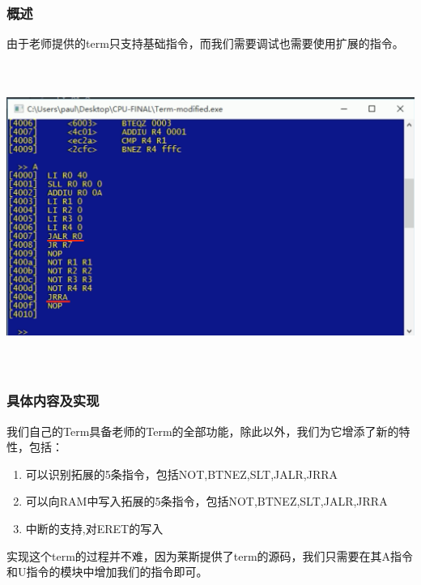\subsubsection{概述}
由于老师提供的term只支持基础指令，而我们需要调试也需要使用扩展的指令。

\begin{center}
    \includegraphics[height=10cm]{image/extension/term}
    \label{fig:ifid}
\end{center}

\subsubsection{具体内容及实现}
我们自己的Term具备老师的Term的全部功能，除此以外，我们为它增添了新的特性，包括：
\begin{enumerate}
    \item 可以识别拓展的5条指令，包括NOT,BTNEZ,SLT,JALR,JRRA
    \item 可以向RAM中写入拓展的5条指令，包括NOT,BTNEZ,SLT,JALR,JRRA
    \item 中断的支持,对ERET的写入
\end{enumerate}

实现这个term的过程并不难，因为莱斯提供了term的源码，我们只需要在其A指令和U指令的模块中增加我们的指令即可。



